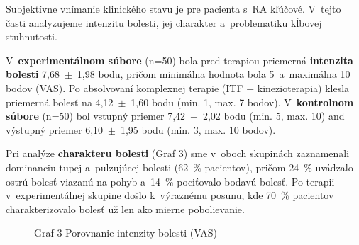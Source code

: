 Subjektívne vnímanie klinického stavu je pre pacienta s~RA kľúčové. V~tejto časti analyzujeme intenzitu bolesti, jej charakter a~problematiku kĺbovej stuhnutosti.

V~\textbf{experimentálnom súbore} (n=50) bola pred terapiou priemerná \textbf{intenzita bolesti} 7,68~$\pm$~1,98 bodu, pričom minimálna hodnota bola 5~a~maximálna 10 bodov (VAS). Po absolvovaní komplexnej terapie (ITF + kinezioterapia) klesla priemerná bolesť na 4,12~$\pm$~1,60 bodu (min. 1, max. 7 bodov). V~\textbf{kontrolnom súbore} (n=50) bol vstupný priemer 7,42~$\pm$~2,02 bodu (min. 5, max. 10) and výstupný priemer 6,10~$\pm$~1,95 bodu (min. 3, max. 10 bodov).

Pri analýze \textbf{charakteru bolesti} (Graf 3) sme v~oboch skupinách zaznamenali dominanciu tupej a~pulzujúcej bolesti (62~\% pacientov), pričom 24~\% uvádzalo ostrú bolesť viazanú na pohyb a~14~\% pociťovalo bodavú bolesť. Po terapii v~experimentálnej skupine došlo k~výraznému posunu, kde 70~\% pacientov charakterizovalo bolesť už len ako mierne pobolievanie.

\begin{figure}[H]
    \centering
    \caption*{Graf 3 Porovnanie intenzity bolesti (VAS)}
    \label{fig:graf_bolest_vas}
\end{figure}

